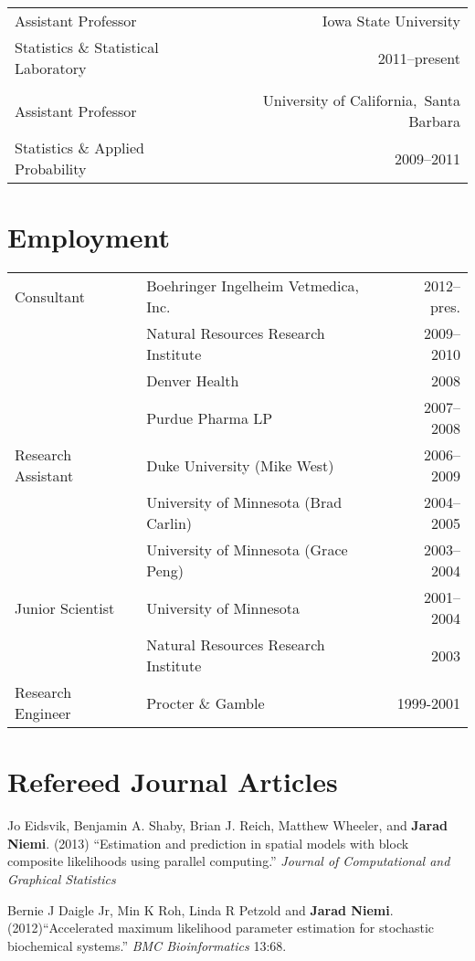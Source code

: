 \documentclass[overlapped,line,letterpaper]{res}
\begin{document}
\begin{resume}
\begin{tabular}{l@{\qquad}r}
Assistant Professor & Iowa State University \\
Statistics \& Statistical Laboratory & 2011--present \\
\\
Assistant Professor & University of California,\ Santa Barbara \\
Statistics \& Applied Probability & 2009--2011
\end{tabular}


\section{\bf Employment}

\begin{tabular}{l@{\qquad}l@{\qquad}r}
Consultant & Boehringer Ingelheim Vetmedica, Inc. & 2012--pres. \\
 & Natural Resources Research Institute  & 2009--2010 \\
 & Denver Health & 2008 \\
 & Purdue Pharma LP & 2007--2008 \\
Research Assistant & Duke University (Mike West) & 2006--2009 \\
 & University of Minnesota (Brad Carlin) & 2004--2005 \\
 & University of Minnesota (Grace Peng) & 2003--2004 \\
Junior Scientist & University of Minnesota & 2001--2004 \\
 & Natural Resources Research Institute & 2003 \\
Research Engineer & Procter \& Gamble & 1999-2001
\end{tabular}


\section{\bf Refereed Journal Articles}

Jo Eidsvik, Benjamin A. Shaby, Brian J. Reich, Matthew Wheeler, and {\bf Jarad Niemi}. (2013) ``Estimation and prediction in spatial models with block composite likelihoods using parallel computing.'' \emph{Journal of Computational and Graphical Statistics}

Bernie J Daigle Jr, Min K Roh, Linda R Petzold and {\bf Jarad Niemi}. (2012)``Accelerated maximum likelihood parameter estimation for stochastic biochemical systems.'' \emph{BMC Bioinformatics} 13:68.


\end{resume}
\end{document}
